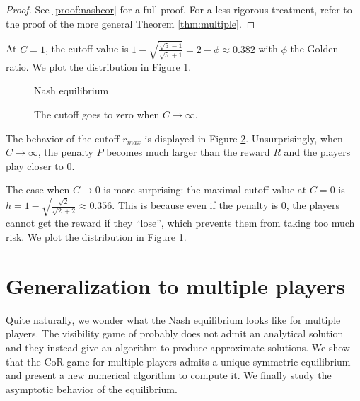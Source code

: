 \documentclass[preprint,12pt,authoryear,doubleblind]{elsarticle}
\theoremstyle{definition}
\begin{document}
\begin{proof}
    See \ref{proof:nashcor} for a full proof. For a less rigorous treatment, refer to the proof of the more general Theorem \ref{thm:multiple}.
\end{proof}

At $C = 1$, the cutoff value is $1 - \sqrt{\frac{\sqrt{5} - 1}{\sqrt{5} + 1}} = 2 - \phi \approx 0.382$ with $\phi$ the Golden ratio. We plot the distribution in Figure \ref{fig:nash}.


\begin{figure}[htbp]
  \centering
  \begin{minipage}[t]{0.48\textwidth}
    \centering
    
  \end{minipage}
  \hfill
  \begin{minipage}[t]{0.48\textwidth}
    \centering
    
  \end{minipage}
  \caption{Nash equilibrium}
  \label{fig:nash}  
\end{figure}


\begin{figure}[htbp]
  \centering
  
  \caption{The cutoff goes to zero when $C \rightarrow\infty$.}
  \label{fig:cutoff}  
\end{figure}


 The behavior of the cutoff ${r_{max}}$ is displayed in Figure \ref{fig:cutoff}. Unsurprisingly, when $C \rightarrow \infty$, the penalty $P$ becomes much larger than the reward $R$ and the players play closer to $0$.

The case when $C \rightarrow 0$ is more surprising: the maximal cutoff value at $C=0$ is $h = 1 - \sqrt{\frac{\sqrt{2}}{\sqrt{2} + 2}} \approx 0.356$. This is because even if the penalty is $0$, the players cannot get the reward if they ``lose'', which prevents them from taking too much risk. We plot the distribution in Figure \ref{fig:nash}. 

\section{Generalization to multiple players}

Quite naturally, we wonder what the Nash equilibrium looks like for multiple players. The visibility game of \citet{Lotker2008-tx} probably does not admit an analytical solution and they instead give an algorithm to produce approximate solutions. We show that the CoR game for multiple players admits a unique symmetric equilibrium and present a new numerical algorithm to compute it. We finally study the asymptotic behavior of the equilibrium. 
\end{document}
